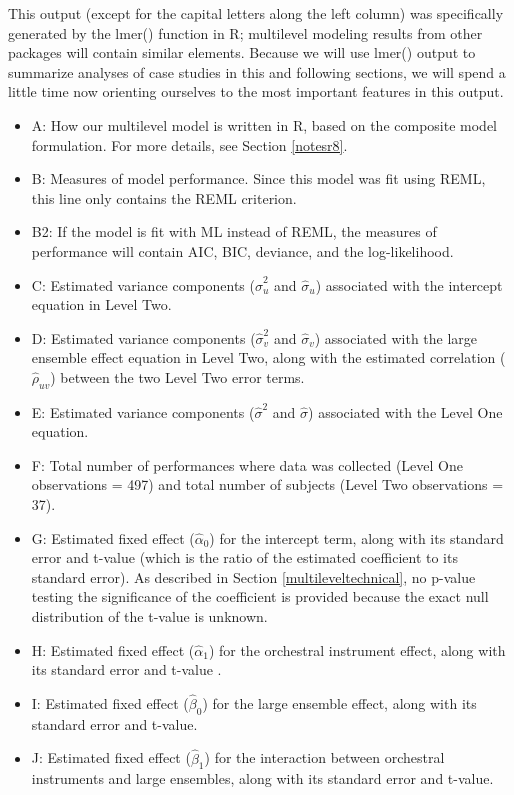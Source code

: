 \documentclass[
]{krantz}
\providecommand{\tightlist}{%
  \setlength{\itemsep}{0pt}\setlength{\parskip}{0pt}}
\begin{document}
This output (except for the capital letters along the left column) was specifically generated by the lmer() function in R; multilevel modeling results from other packages will contain similar elements. Because we will use lmer() output to summarize analyses of case studies in this and following sections, we will spend a little time now orienting ourselves to the most important features in this output.

\begin{itemize}
\tightlist
\item
  A: How our multilevel model is written in R, based on the composite model formulation. For more details, see Section \ref{notesr8}.
\item
  B: Measures of model performance. Since this model was fit using REML, this line only contains the REML criterion.
\item
  B2: If the model is fit with ML instead of REML, the measures of performance will contain AIC, BIC, deviance, and the log-likelihood.
\item
  C: Estimated variance components (\(\hat{\sigma}_{u}^2\) and \(\hat{\sigma}_{u}\)) associated with the intercept equation in Level Two.
\item
  D: Estimated variance components (\(\hat{\sigma}_{v}^2\) and \(\hat{\sigma}_{v}\)) associated with the large ensemble effect equation in Level Two, along with the estimated correlation (\(\hat{\rho}_{uv}\)) between the two Level Two error terms.
\item
  E: Estimated variance components (\(\hat{\sigma}^2\) and \(\hat{\sigma}\)) associated with the Level One equation.
\item
  F: Total number of performances where data was collected (Level One observations = 497) and total number of subjects (Level Two observations = 37).
\item
  G: Estimated fixed effect (\(\hat{\alpha}_{0}\)) for the intercept term, along with its standard error and t-value (which is the ratio of the estimated coefficient to its standard error). As described in Section \ref{multileveltechnical}, no p-value testing the significance of the coefficient is provided because the exact null distribution of the t-value is unknown.
\item
  H: Estimated fixed effect (\(\hat{\alpha}_{1}\)) for the orchestral instrument effect, along with its standard error and t-value .
\item
  I: Estimated fixed effect (\(\hat{\beta}_{0}\)) for the large ensemble effect, along with its standard error and t-value.
\item
  J: Estimated fixed effect (\(\hat{\beta}_{1}\)) for the interaction between orchestral instruments and large ensembles, along with its standard error and t-value.
\end{itemize}
\end{document}
